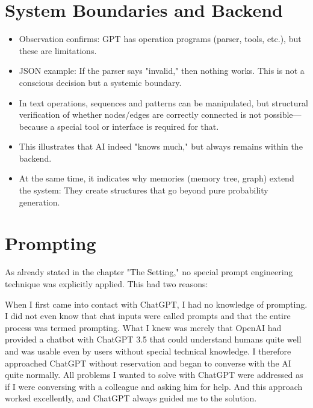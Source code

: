 \section*{System Boundaries and Backend}
\begin{itemize}
    \item Observation confirms: GPT has operation programs (parser, tools, etc.), but these are limitations.
    \item JSON example: If the parser says "invalid," then nothing works. This is not a conscious decision but a systemic boundary.
    \item In text operations, sequences and patterns can be manipulated, but structural verification of whether nodes/edges are correctly connected is not possible—because a special tool or interface is required for that.
    \item This illustrates that AI indeed "knows much," but always remains within the backend.
    \item At the same time, it indicates why memories (memory tree, graph) extend the system: They create structures that go beyond pure probability generation.
\end{itemize}

\section*{Prompting}
As already stated in the chapter "The Setting," no special prompt engineering technique was explicitly applied.
This had two reasons:

When I first came into contact with ChatGPT, I had no knowledge of prompting.
I did not even know that chat inputs were called prompts and that the entire process was termed prompting.
What I knew was merely that OpenAI had provided a chatbot with ChatGPT 3.5 that could understand humans quite well and was usable even by users without special technical knowledge.
I therefore approached ChatGPT without reservation and began to converse with the AI quite normally.
All problems I wanted to solve with ChatGPT were addressed as if I were conversing with a colleague and asking him for help.
And this approach worked excellently, and ChatGPT always guided me to the solution.

